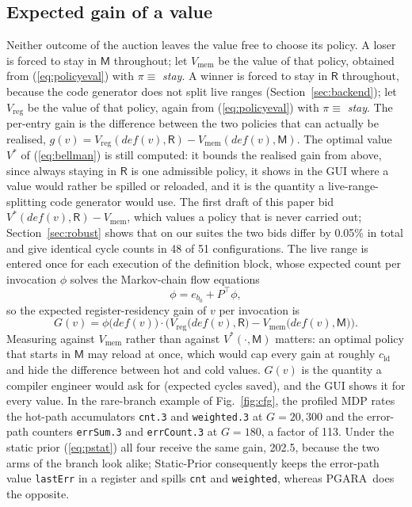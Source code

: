 \documentclass{ieeeaccess}
\newcommand{\MG}{PGARA}
\newcommand{\Reg}{\mathsf{R}}
\newcommand{\Mem}{\mathsf{M}}
\newcommand{\cld}{c_{\mathrm{ld}}}
\newcommand{\tm}[1]{\texttt{#1}}
\begin{document}
\subsection{Expected gain of a value}

Neither outcome of the auction leaves the value free to choose its
policy. A loser is forced to stay in $\Mem$ throughout; let
$V_{\mathrm{mem}}$ be the value of that policy, obtained from
(\ref{eq:policyeval}) with $\pi\equiv$ \emph{stay}. A winner is forced
to stay in $\Reg$ throughout, because the code generator does not split
live ranges (Section~\ref{sec:backend}); let $V_{\mathrm{reg}}$ be the
value of that policy, again from (\ref{eq:policyeval}) with
$\pi\equiv$ \emph{stay}. The per-entry gain is the difference between
the two policies that can actually be realised,
$g(v)=V_{\mathrm{reg}}(\mathit{def}(v),\Reg)-V_{\mathrm{mem}}(\mathit{def}(v),\Mem)$.
The optimal value $V^\ast$ of (\ref{eq:bellman}) is still computed: it
bounds the realised gain from above, since always staying in $\Reg$ is
one admissible policy, it shows in the GUI where a value would rather
be spilled or reloaded, and it is the quantity a live-range-splitting
code generator would use. The first draft of this paper bid
$V^\ast(\mathit{def}(v),\Reg)-V_{\mathrm{mem}}$, which values a policy
that is never carried out; Section~\ref{sec:robust} shows that on our
suites the two bids differ by 0.05\% in total and give identical cycle
counts in 48 of 51 configurations.
The live range is entered once for each execution of the definition
block, whose expected count per invocation $\phi$ solves the
Markov-chain flow equations
\begin{equation}
\phi = e_{b_0} + P^{\top}\phi ,
\label{eq:freq}
\end{equation}
so the expected register-residency gain of $v$ per invocation is
\begin{equation}
G(v)=\phi\big(\mathit{def}(v)\big)\cdot
\Big(V_{\mathrm{reg}}\big(\mathit{def}(v),\Reg\big)-V_{\mathrm{mem}}\big(\mathit{def}(v),\Mem\big)\Big).
\label{eq:gain}
\end{equation}
Measuring against $V_{\mathrm{mem}}$ rather than against
$V^\ast(\cdot,\Mem)$ matters: an optimal policy that starts in $\Mem$
may reload at once, which would cap every gain at roughly $\cld$ and
hide the difference between hot and cold values.
$G(v)$ is the quantity a compiler engineer would ask for (expected
cycles saved), and the GUI shows it for every value. In the rare-branch
example of Fig.~\ref{fig:cfg}, the profiled MDP rates the hot-path
accumulators \tm{cnt.3} and \tm{weighted.3} at $G=20{,}300$ and the
error-path counters \tm{errSum.3} and \tm{errCount.3} at $G=180$, a
factor of 113. Under the static prior (\ref{eq:pstat}) all four receive
the same gain, 202.5, because the two arms of the branch look alike;
Static-Prior consequently keeps the error-path value \tm{lastErr} in a
register and spills \tm{cnt} and \tm{weighted}, whereas \MG\ does the
opposite.
\end{document}
